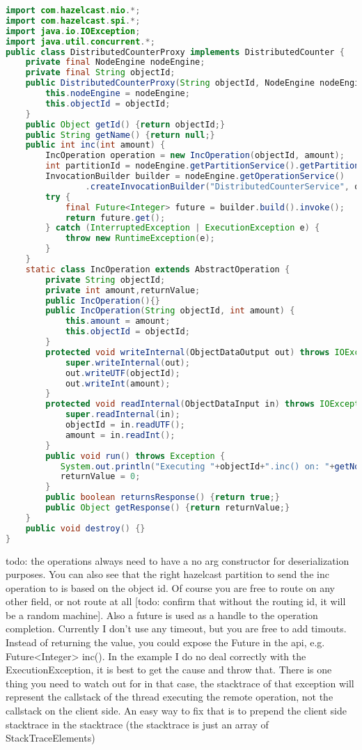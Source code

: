 \begin{lstlisting}[language=java]
import com.hazelcast.nio.*;
import com.hazelcast.spi.*;
import java.io.IOException;
import java.util.concurrent.*;
public class DistributedCounterProxy implements DistributedCounter {
    private final NodeEngine nodeEngine;
    private final String objectId;
    public DistributedCounterProxy(String objectId, NodeEngine nodeEngine) {
        this.nodeEngine = nodeEngine;
        this.objectId = objectId;
    }
    public Object getId() {return objectId;}
    public String getName() {return null;}
    public int inc(int amount) {
        IncOperation operation = new IncOperation(objectId, amount);
        int partitionId = nodeEngine.getPartitionService().getPartitionId(objectId);
        InvocationBuilder builder = nodeEngine.getOperationService()
                .createInvocationBuilder("DistributedCounterService", operation, partitionId);
        try {
            final Future<Integer> future = builder.build().invoke();
            return future.get();
        } catch (InterruptedException | ExecutionException e) {
            throw new RuntimeException(e);
        }
    }
    static class IncOperation extends AbstractOperation {
        private String objectId;
        private int amount,returnValue;
        public IncOperation(){}
        public IncOperation(String objectId, int amount) {
            this.amount = amount;
            this.objectId = objectId;
        }
        protected void writeInternal(ObjectDataOutput out) throws IOException {
            super.writeInternal(out);
            out.writeUTF(objectId);
            out.writeInt(amount);
        }
        protected void readInternal(ObjectDataInput in) throws IOException {
            super.readInternal(in);
            objectId = in.readUTF();
            amount = in.readInt();
        }
        public void run() throws Exception {
           System.out.println("Executing "+objectId+".inc() on: "+getNodeEngine().getThisAddress());            
           returnValue = 0;
        }
        public boolean returnsResponse() {return true;}
        public Object getResponse() {return returnValue;}
    }
    public void destroy() {}
}
\end{lstlisting}
todo: the operations always need to have a no arg constructor for deserialization purposes. You can also see that the right hazelcast partition to send the inc operation to is based on the object id. Of course you are free to route on any other field, or not route at all [todo: confirm that without the routing id, it will be a random machine]. Also a future is used as a handle to the operation completion. Currently I don't use any timeout, but you are free to add timouts. Instead of returning the value, you could expose the Future in the api, e.g. Future<Integer> inc(). In the example I do no deal correctly with the ExecutionException, it is best to get the cause and throw that. There is one thing you need to watch out for in that case, the stacktrace of that exception will represent the callstack of the thread executing the remote operation, not the callstack on the client side. An easy way to fix that is to prepend  the client side stacktrace in the stacktrace (the stacktrace is just an array of StackTraceElements)


